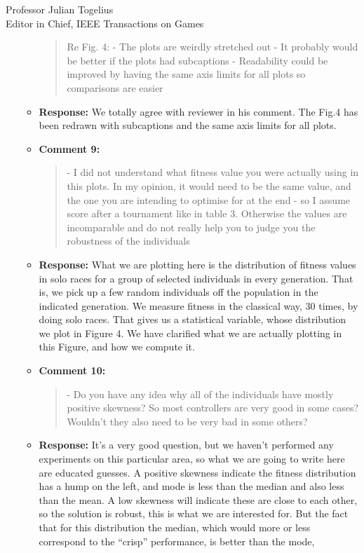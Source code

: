 \documentclass[10pt]{letter} %
\begin{document}
\begin{letter}{Professor Julian Togelius \\ Editor in Chief, IEEE Transactions on Games}
\begin{enumerate}
\begin{itemize}
				\begin{quote}	
					Re Fig. 4:
					- The plots are weirdly stretched out
					- It probably would be better if the plots had subcaptions
					- Readability could be improved by having the same axis limits for all plots so comparisons are easier
				\end{quote}	
			\item {\bf Response:} 
				We totally agree with reviewer in his comment. The Fig.4 has been redrawn with subcaptions and the same axis limits for all plots.
			\item {\bf Comment 9:}
				\begin{quote}	
					- I did not understand what fitness value you were actually using in this plots. In my opinion, it would need to be the same value, and the one you are intending to optimise for at the end - so I assume score after a tournament like in table 3. Otherwise the values are incomparable and do not really help you to judge you the robustness of the individuals
				\end{quote}	
			\item {\bf Response:} 
What we are plotting here is the distribution of fitness values in
solo races for a group of selected individuals in every
generation. That is, we pick up a few random individuals off the
population in the indicated generation. We measure fitness in the
classical way, 30 times, by doing solo races. That gives us a
statistical variable, whose distribution we plot in Figure 4. We have
clarified what we are actually plotting in this Figure, and how we
compute it.
			\item {\bf Comment 10:}
				\begin{quote}
					- Do you have any idea why all of the individuals have mostly positive skewness? So most controllers are very good in some cases? Wouldn't they also need to be very bad in some others?
				\end{quote}
			\item {\bf Response:}
It's a very good question, but we haven't performed any experiments on
this particular area, so what we are going to write here are educated
guesses. A positive skewness indicate the fitness distribution has a
hump on the left, and mode is less than the median and also less than
the mean. A low skewness will indicate these are close to each other,
so the solution is robust, this is what we are interested for. But the
fact that for this distribution the median, which would more or less
correspond to the ``crisp'' performance, is better than the mode,

\end{itemize}
\end{enumerate}
\end{letter}
\end{document}

